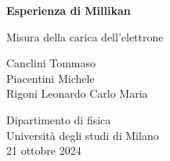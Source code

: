 \begin{titlepage}
    \begin{center}
        \vspace*{1cm}
            
        \Huge
        \textbf{Esperienza di Millikan}
            
        \vspace{0.5cm}
        \LARGE
        Misura della carica dell'elettrone            
        \vspace{1.5cm}
            
        Canclini Tommaso\\
        Piacentini Michele\\
        Rigoni Leonardo Carlo Maria
            
        \vfill
            
        \vspace{0.8cm}
            
            
        \Large
        Dipartimento di fisica\\
        Università degli studi di Milano\\
        21 ottobre 2024
            
    \end{center}
\end{titlepage}